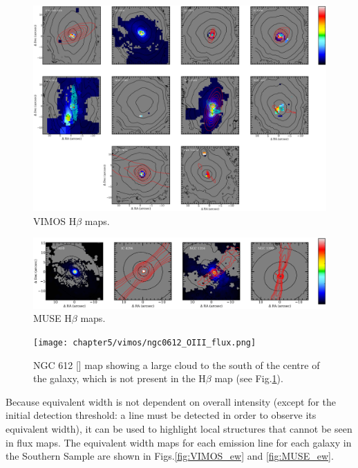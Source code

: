 		\begin{figure}
			\centering
			\includegraphics[width=\textwidth]{chapter5/vimos/Hb.png}
			\caption[VIMOS H$\beta$ maps]{VIMOS H$\beta$ maps.} 
			\label{fig:VIMOS_Hb}
		\end{figure}
		\begin{figure}
			\centering
			\includegraphics[width=\textwidth]{chapter5/muse/Hb.png}
			\caption[MUSE H$\beta$ maps]{MUSE H$\beta$ maps.} 
			\label{fig:MUSE_Hb}
		\end{figure}


		\begin{figure}
			\centering
			\texttt{[image: chapter5/vimos/ngc0612\_OIII\_flux.png]}
			\caption[NGC 612  image]{NGC 612 [] map showing a large cloud to the south of the centre of the galaxy, which is not present in the H$\beta$ map (see Fig.\ref{fig:VIMOS_Hb}).} 
			\label{fig:NGC612_OIII}
		\end{figure}


		Because equivalent width is not dependent on overall intensity (except for the initial detection threshold: a line must be detected in order to observe its equivalent width), it can be used to highlight local structures that cannot be seen in flux maps. The equivalent width maps for each emission line for each galaxy in the Southern Sample are shown in Figs.\ref{fig:VIMOS_ew} and \ref{fig:MUSE_ew}. 

